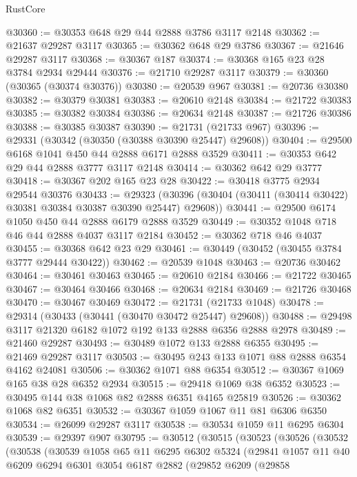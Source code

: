\begin{lexlean}{RustCore}
\begin{coremodule}
@30360 := @30353 @648 @29 @44 @2888 @3786 @3117 @2148
@30362 := @21637 @29287 @3117
@30365 := @30362 @648 @29 @3786
@30367 := @21646 @29287 @3117
@30368 := @30367 @187
@30374 := @30368 @165 @23 @28 @3784 @2934 @29444
@30376 := @21710 @29287 @3117
@30379 := @30360 (@30365 (@30374 @30376))
@30380 := @20539 @967
@30381 := @20736 @30380
@30382 := @30379 @30381
@30383 := @20610 @2148
@30384 := @21722 @30383
@30385 := @30382 @30384
@30386 := @20634 @2148
@30387 := @21726 @30386
@30388 := @30385 @30387
@30390 := @21731 (@21733 @967)
@30396 := @29331 (@30342 (@30350 (@30388 @30390 @25447) @29608))
@30404 := @29500 @6168 @1041 @450 @44 @2888 @6171 @2888 @3529
@30411 := @30353 @642 @29 @44 @2888 @3777 @3117 @2148
@30414 := @30362 @642 @29 @3777
@30418 := @30367 @202 @165 @23 @28
@30422 := @30418 @3775 @2934 @29544 @30376
@30433 := @29323
    (@30396 (@30404 (@30411 (@30414 @30422) @30381 @30384 @30387 @30390 @25447) @29608))
@30441 := @29500 @6174 @1050 @450 @44 @2888 @6179 @2888 @3529
@30449 := @30352 @1048 @718 @46 @44 @2888 @4037 @3117 @2184
@30452 := @30362 @718 @46 @4037
@30455 := @30368 @642 @23 @29
@30461 := @30449 (@30452 (@30455 @3784 @3777 @29444 @30422))
@30462 := @20539 @1048
@30463 := @20736 @30462
@30464 := @30461 @30463
@30465 := @20610 @2184
@30466 := @21722 @30465
@30467 := @30464 @30466
@30468 := @20634 @2184
@30469 := @21726 @30468
@30470 := @30467 @30469
@30472 := @21731 (@21733 @1048)
@30478 := @29314 (@30433 (@30441 (@30470 @30472 @25447) @29608))
@30488 := @29498 @3117 @21320 @6182 @1072 @192 @133 @2888 @6356 @2888 @2978
@30489 := @21460 @29287
@30493 := @30489 @1072 @133 @2888 @6355
@30495 := @21469 @29287 @3117
@30503 := @30495 @243 @133 @1071 @88 @2888 @6354 @4162 @24081
@30506 := @30362 @1071 @88 @6354
@30512 := @30367 @1069 @165 @38 @28 @6352 @2934
@30515 := @29418 @1069 @38 @6352
@30523 := @30495 @144 @38 @1068 @82 @2888 @6351 @4165 @25819
@30526 := @30362 @1068 @82 @6351
@30532 := @30367 @1059 @1067 @11 @81 @6306 @6350
@30534 := @26099 @29287 @3117
@30538 := @30534 @1059 @11 @6295 @6304
@30539 := @29397 @907
@30795 := @30512
    (@30515
      (@30523
        (@30526
          (@30532
            (@30538
              (@30539
                @1058
                @65
                @11
                @6295
                @6302
                @5324
                (@29841
                  @1057
                  @11
                  @40
                  @6209
                  @6294
                  @6301
                  @3054
                  @6187
                  @2882
                  (@29852
                    @6209
                    (@29858

\end{coremodule}
\end{lexlean}

